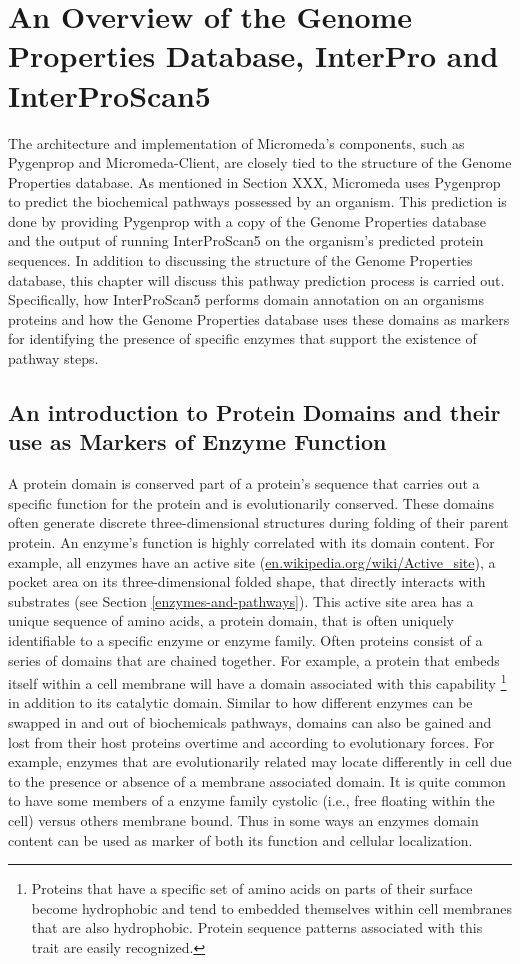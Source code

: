 \chapter{An Overview of the Genome Properties Database, InterPro and InterProScan5} \label{genome-properties} 

The architecture and implementation of Micromeda's components, such as Pygenprop and Micromeda-Client, are closely tied to the structure of the Genome Properties database. As mentioned in Section XXX, Micromeda uses Pygenprop to predict the biochemical pathways possessed by an organism. This prediction is done by providing Pygenprop with a copy of the Genome Properties database and the output of running InterProScan5 on the organism's predicted protein sequences. In addition to discussing the structure of the Genome Properties database, this chapter will discuss this pathway prediction process is carried out. Specifically, how InterProScan5 performs domain annotation on an organisms proteins and how the Genome Properties database uses these domains as markers for identifying the presence of specific enzymes that support the existence of pathway steps.

\section{An introduction to Protein Domains and their use as Markers of Enzyme Function}

A protein domain is conserved part of a protein's sequence that carries out a specific function for the protein and is evolutionarily conserved. These domains often generate discrete three-dimensional structures during folding of their parent protein. An enzyme's function is highly correlated with its domain content. For example, all enzymes have an active site (\href{en.wikipedia.org/wiki/Active\_site}{en.wikipedia.org/wiki/Active\_site}), a pocket area on its three-dimensional folded shape, that directly interacts with substrates (see Section \ref{enzymes-and-pathways}). This active site area has a unique sequence of amino acids, a protein domain, that is often uniquely identifiable to a specific enzyme or enzyme family. Often proteins consist of a series of domains that are chained together. For example, a protein that embeds itself within a cell membrane will have a domain associated with this capability \footnote{Proteins that have a specific set of amino acids on parts of their surface become hydrophobic and tend to embedded themselves within cell membranes that are also hydrophobic. Protein sequence patterns associated with this trait are easily recognized.} in addition to its catalytic domain. Similar to how different enzymes can be swapped in and out of biochemicals pathways, domains can also be gained and lost from their host proteins overtime and according to evolutionary forces. For example, enzymes that are evolutionarily related may locate differently in cell due to the presence or absence of a membrane associated domain. It is quite common to have some members of a enzyme family cystolic (i.e., free floating within the cell) versus others membrane bound. Thus in some ways an enzymes domain content can be used as marker of both its function and cellular localization.

